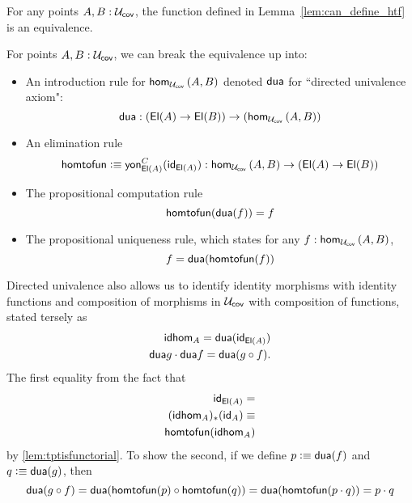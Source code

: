 \documentclass[main.tex]{subfiles}
\begin{document}
\begin{axiom}
    For any points $A,B : \uc$, the function defined in Lemma~\cref{lem:can_define_htf} is an equivalence.
\end{axiom}

For points $A,B : \uc$, we can break the equivalence up into:
\begin{itemize}
    \item An introduction rule for $\ho[\uc]{A}{B}$ denoted $\dua$ for ``directed univalence axiom":
    $$\dua : (\El(A) \to \El(B)) \to (\ho[\uc]{A}{B})$$
    \item An elimination rule
    $$\htf \defeq \yon{C}{\El(A)}(\id{\El(A)}) : \ho[\uc]{A}{B} \to (\El(A) \to \El(B))$$
    \item The propositional computation rule
        $$\htf(\dua(f)) = f$$
    \item The propositional uniqueness rule, which states for any $f : \ho[\uc]{A} {B}$,
    $$f = \dua(\htf(f))$$
\end{itemize}
Directed univalence also allows us to identify identity morphisms with identity functions and composition of morphisms in $\uc$ with composition of functions, stated tersely as
\begin{align*}
    \idhom{A} = \dua(\id{\El(A)})\\
    \dua{g}\cdot\dua{f} = \dua(g \circ f).
\end{align*}
The first equality from the fact that \begin{align*}
\id{\El(A)} = \\
(\idhom{A})_*(\id{A}) \equiv \\
\htf(\idhom{A})
\end{align*} by \cref{lem:tptisfunctorial}. To show the second, if we define $p \defeq \dua(f)$ and $q \defeq \dua(g)$, then
    $$\dua(g \circ f) = \dua(\htf(p) \circ \htf(q)) = \dua(\htf(p \cdot q)) = p \cdot q$$
\end{document}
